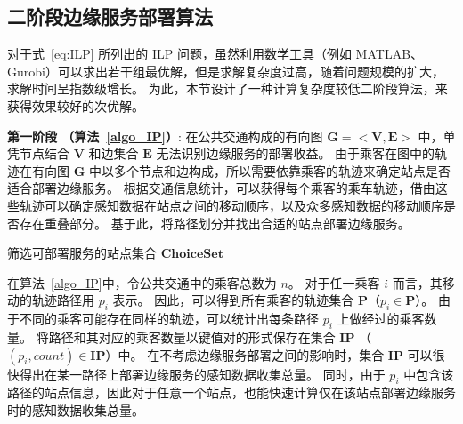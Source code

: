 \subsection{二阶段边缘服务部署算法}

对于式~\eqref{eq:ILP} 所列出的 ILP 问题，虽然利用数学工具（例如 MATLAB、Gurobi）可以求出若干组最优解，但是求解复杂度过高，随着问题规模的扩大，求解时间呈指数级增长。
为此，本节设计了一种计算复杂度较低二阶段算法，来获得效果较好的次优解。

\textbf{第一阶段 （算法~\ref{algo_IP}）}:
在公共交通构成的有向图 $\boldsymbol{G}=<\boldsymbol{V}, \boldsymbol{E}>$ 中，单凭节点结合 $\boldsymbol{V}$ 和边集合 $\boldsymbol{E}$ 无法识别边缘服务的部署收益。
由于乘客在图中的轨迹在有向图 $\boldsymbol{G}$ 中以多个节点和边构成，所以需要依靠乘客的轨迹来确定站点是否适合部署边缘服务。
根据交通信息统计，可以获得每个乘客的乘车轨迹，借由这些轨迹可以确定感知数据在站点之间的移动顺序，以及众多感知数据的移动顺序是否存在重叠部分。
基于此，将路径划分并找出合适的站点部署边缘服务。

\begin{algorithm}[!b]
\setstretch{\algostretch}
\caption{筛选可部署服务的站点集合 $\boldsymbol{ChoiceSet}$}
\label{algo_IP}
\end{algorithm}

在算法~\ref{algo_IP}中，令公共交通中的乘客总数为 $n$。
对于任一乘客 $i$ 而言，其移动的轨迹路径用 $p_i$ 表示。
因此，可以得到所有乘客的轨迹集合 $\boldsymbol{P}$（$p_i \in \boldsymbol{P}$）。
由于不同的乘客可能存在同样的轨迹，可以统计出每条路径 $p_i$ 上做经过的乘客数量。
将路径和其对应的乘客数量以键值对的形式保存在集合 $\boldsymbol{IP}$ （$(p_i, count) \in \boldsymbol{IP}$）中。
在不考虑边缘服务部署之间的影响时，集合 $\boldsymbol{IP}$ 可以很快得出在某一路径上部署边缘服务的感知数据收集总量。
同时，由于 $p_i$ 中包含该路径的站点信息，因此对于任意一个站点，也能快速计算仅在该站点部署边缘服务时的感知数据收集总量。

